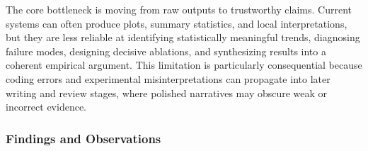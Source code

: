 The core bottleneck is moving from raw outputs to trustworthy claims. Current systems can often produce plots, summary statistics, and local interpretations, but they are less reliable at identifying statistically meaningful trends, diagnosing failure modes, designing decisive ablations, and synthesizing results into a coherent empirical argument. This limitation is particularly consequential because coding errors and experimental misinterpretations can propagate into later writing and review stages, where polished narratives may obscure weak or incorrect evidence.



\subsubsection{Findings and Observations}
\label{sec:s3_findings}

